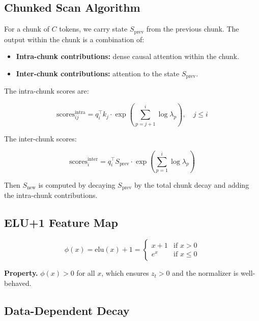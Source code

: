 \subsection{Chunked Scan Algorithm}

For a chunk of $C$ tokens, we carry state $S_\text{prev}$ from the previous 
chunk. The output within the chunk is a combination of:

\begin{itemize}
\item \textbf{Intra-chunk contributions:} dense causal attention within the chunk.
\item \textbf{Inter-chunk contributions:} attention to the state $S_\text{prev}$.

\end{itemize}
The intra-chunk scores are:

\begin{equation}
\text{scores}_{ij}^\text{intra} = q_i^\top k_j \cdot 
\exp\!\left(\sum_{p=j+1}^{i} \log \lambda_p\right), \quad j \leq i
\end{equation}

The inter-chunk scores:

\begin{equation}
\text{scores}_{i}^\text{inter} = q_i^\top S_\text{prev} \cdot 
\exp\!\left(\sum_{p=1}^{i} \log \lambda_p\right)
\end{equation}

Then $S_\text{new}$ is computed by decaying $S_\text{prev}$ by the total 
chunk decay and adding the intra-chunk contributions.

\subsection{ELU+1 Feature Map}

\begin{equation}
\phi(x) = \text{elu}(x) + 1 = \begin{cases}
x + 1 & \text{if } x > 0 \\
e^x & \text{if } x \leq 0
\end{cases}
\end{equation}

\textbf{Property.} $\phi(x) > 0$ for all $x$, which ensures $z_t > 0$ and the 
normalizer is well-behaved.

\subsection{Data-Dependent Decay}

